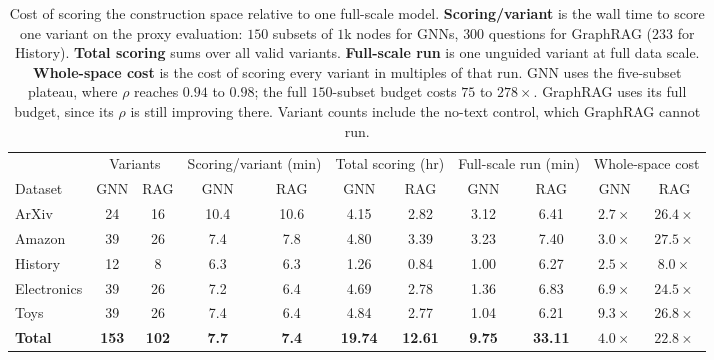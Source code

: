 \begin{table}[h]
\centering
\renewcommand{\arraystretch}{1.25}
\caption{Cost of scoring the construction space relative to one full-scale model. \textbf{Scoring/variant} is the wall time to score one variant on the proxy evaluation: $150$ subsets of $1$k nodes for GNNs, $300$ questions for GraphRAG ($233$ for History). \textbf{Total scoring} sums over all valid variants. \textbf{Full-scale run} is one unguided variant at full data scale. \textbf{Whole-space cost} is the cost of scoring every variant in multiples of that run. GNN uses the five-subset plateau, where $\rho$ reaches $0.94$ to $0.98$; the full $150$-subset budget costs $75$ to $278\times$. GraphRAG uses its full budget, since its $\rho$ is still improving there. Variant counts include the no-text control, which GraphRAG cannot run.}
\vspace{5pt}
\label{tab:timing}
\setlength{\tabcolsep}{3.6pt}
\small
\begin{tabular}{@{}l cc cc cc cc cc@{}}
\toprule
 & \multicolumn{2}{c}{Variants} & \multicolumn{2}{c}{Scoring/variant (min)}
 & \multicolumn{2}{c}{Total scoring (hr)} & \multicolumn{2}{c}{Full-scale run (min)}
 & \multicolumn{2}{c}{Whole-space cost} \\
\cmidrule(lr){2-3} \cmidrule(lr){4-5} \cmidrule(lr){6-7}
\cmidrule(lr){8-9} \cmidrule(lr){10-11}
Dataset & GNN & RAG & GNN & RAG & GNN & RAG & GNN & RAG & GNN & RAG \\
\midrule
ArXiv       & 24 & 16 & 10.4 & 10.6 & 4.15 & 2.82 & 3.12 & 6.41 & $\mathbf{2.7\times}$ & $26.4\times$ \\
Amazon      & 39 & 26 & 7.4 & 7.8 & 4.80 & 3.39 & 3.23 & 7.40 & $\mathbf{3.0\times}$ & $27.5\times$ \\
History     & 12 & 8 & 6.3 & 6.3 & 1.26 & 0.84 & 1.00 & 6.27 & $\mathbf{2.5\times}$ & $8.0\times$ \\
Electronics & 39 & 26 & 7.2 & 6.4 & 4.69 & 2.78 & 1.36 & 6.83 & $\mathbf{6.9\times}$ & $24.5\times$ \\
Toys        & 39 & 26 & 7.4 & 6.4 & 4.84 & 2.77 & 1.04 & 6.21 & $\mathbf{9.3\times}$ & $26.8\times$ \\
\midrule
\textbf{Total} & \textbf{153} & \textbf{102} & \textbf{7.7} & \textbf{7.4} & \textbf{19.74} & \textbf{12.61} & \textbf{9.75} & \textbf{33.11} & $\mathbf{4.0\times}$ & $\mathbf{22.8\times}$ \\
\bottomrule
\end{tabular}
\end{table}
